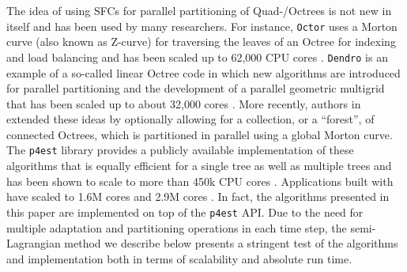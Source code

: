 The idea of using SFCs for parallel partitioning of Quad-/Octrees is not new in itself and has been used by many researchers. For instance, \texttt{Octor} \cite{Tu;OHallaron;Ghattas:05:Scalable-parallel-oc} uses a Morton curve (also known as Z-curve) for traversing the leaves of an Octree for indexing and load balancing and has been scaled up to 62,000 CPU cores \cite{Burstedde;Ghattas;Gurnis;etal:08:Scalable-adaptive-ma}.
\texttt{Dendro} \cite{Sampath;Adavani;Sundar;etal:08:Dendro:-parallel-alg} is
an example of a so-called linear Octree code in which new algorithms are
introduced for parallel partitioning and the development of a parallel
geometric multigrid that has been scaled up to about 32,000 cores
\cite{Sampath;Biros:10:A-parallel-geometric}.
More recently, authors in
\cite{Burstedde;Wilcox;Ghattas:11:p4est:-Scalable-Algo} extended these ideas by
optionally allowing for a collection, or a ``forest'', of connected Octrees,
which is partitioned in parallel using a global Morton curve.
%
%
%
The \texttt{p4est} library \cite{p4est-github} provides a publicly available
implementation of these algorithms that is equally efficient for a single tree
as well as multiple trees and has been shown to scale to more than
450k CPU cores \cite{IsaacBursteddeWilcoxEtAl15}.
Applications built with \pforest have scaled to 1.6M cores
\cite{RudiMalossiIsaacEtAl15}
and 2.9M cores \cite{MullerKoperaMarrasEtAl15}.
In fact, the algorithms presented in this paper are implemented on top of
the \texttt{p4est} API.
Due to the need for multiple adaptation and partitioning operations in each
time step, the semi-Lagrangian method we describe below presents a stringent
test of the algorithms and implementation both in terms of scalability and
absolute run time.
%

